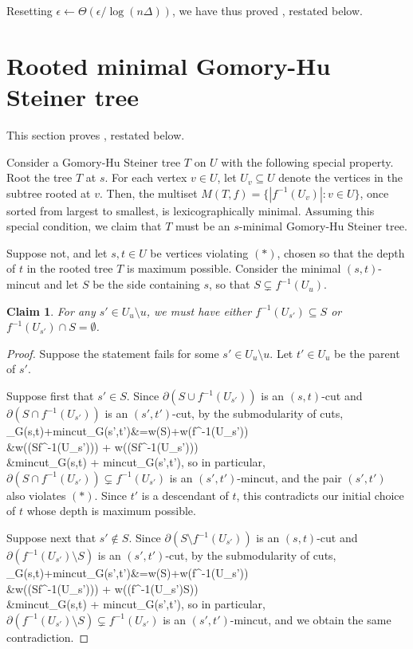 \documentclass{article}
\newcommand{\sm}{\setminus}
\newcommand{\s}{\subseteq}
\def\BAL#1\EAL{\begin{align*}#1\end{align*}}
\newcommand{\inv}{^{-1}}
\newcommand{\e}{\epsilon}
\newcommand{\De}{\Delta}
\newcommand{\pt}{\partial}
\newcommand{\Th}{\Theta}
\newcommand{\1}{\mathbbm 1}
\newtheorem{claim}[theorem]{Claim}
\newcommand{\BCL}{\begin{claim}}
\newcommand{\ECL}{\end{claim}}
\newcommand{\BP}{\begin{proof}}
\newcommand{\EP}{\end{proof}}
\newcommand{\thm}[1]{\Cref{thm:#1}}
\newcommand{\clml}[1]{\label{clm:#1}}
\newcommand{\mincut}{\textsf{\textup{mincut}}}
\begin{document}
Resetting $\e\gets\Th(\e/\log(n\De))$, we have thus proved \thm{approx-w}, restated below.
\ApproxW*


\appendix

\section{Rooted minimal Gomory-Hu Steiner tree}

This section proves \thm{rooted}, restated below.
\Rooted*

Consider a Gomory-Hu Steiner tree $T$ on $U$ with the following special property. Root the tree $T$ at $s$. For each vertex $v\in U$, let $U_v\s U$ denote the vertices in the subtree rooted at $v$. Then, the multiset $M(T,f)=\{ |f\inv(U_v)| : v\in U\}$, once sorted from largest to smallest, is lexicographically minimal. Assuming this special condition, we claim that $T$ must be an $s$-minimal Gomory-Hu Steiner tree.

Suppose not, and let $s,t\in U$ be vertices violating $(*)$, chosen so that the depth of $t$ in the rooted tree $T$ is maximum possible. Consider the minimal $(s,t)$-mincut and let $S$ be the side containing $s$, so that $S\subsetneq f\inv(U_u)$.

\BCL\clml{Us}
For any $s'\in U_u\sm u$, we must have either $f\inv(U_{s'})\s S$ or $f\inv(U_{s'})\cap S=\emptyset$.
\ECL
\BP
Suppose the statement fails for some $s'\in U_u\sm u$. Let $t'\in U_u$ be the parent of $s'$.

Suppose first that $s'\in S$. Since $\pt(S\cup f\inv(U_{s'}))$ is an $(s,t)$-cut and $\pt(S\cap f\inv(U_{s'}))$ is an $(s',t')$-cut, by the submodularity of cuts,
\BAL
\mincut_G(s,t)+\mincut_G(s',t')&=w(\pt S)+w(\pt f\inv(U_{s'})) 
\\&\ge w(\pt(S\cup f\inv(U_{s'}))) + w(\pt(S\cap f\inv(U_{s'}))) 
\\&\ge \mincut_G(s,t) + \mincut_G(s',t'),
\EAL
so in particular, $\pt(S\cap f\inv(U_{s'})) \subsetneq f\inv(U_{s'})$ is an $(s',t')$-mincut, and the pair $(s',t')$ also violates $(*)$. Since $t'$ is a descendant of $t$, this contradicts our initial choice of $t$ whose depth is maximum possible.

Suppose next that $s'\notin S$. Since $\pt(S\sm f\inv(U_{s'}))$ is an $(s,t)$-cut and $\pt(f\inv(U_{s'})\sm S)$ is an $(s',t')$-cut, by the submodularity of cuts,
\BAL
\mincut_G(s,t)+\mincut_G(s',t')&=w(\pt S)+w(\pt f\inv(U_{s'})) 
\\&\ge w(\pt(S\sm f\inv(U_{s'}))) + w(\pt(f\inv(U_{s'})\sm S)) 
\\&\ge \mincut_G(s,t) + \mincut_G(s',t'),
\EAL
so in particular, $\pt(f\inv(U_{s'})\sm S)\subsetneq f\inv(U_{s'})$ is an $(s',t')$-mincut, and we obtain the same contradiction.
\EP
\end{document}
